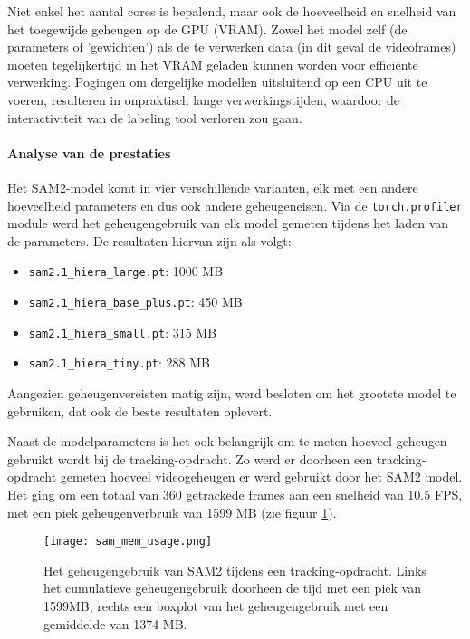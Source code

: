 Niet enkel het aantal cores is bepalend, maar ook de hoeveelheid en snelheid van het toegewijde geheugen op de GPU (VRAM).
Zowel het model zelf (de parameters of 'gewichten') als de te verwerken data (in dit geval de videoframes) moeten tegelijkertijd 
in het VRAM geladen kunnen worden voor efficiënte verwerking.
Pogingen om dergelijke modellen uitsluitend op een CPU uit te voeren, resulteren in onpraktisch lange verwerkingstijden, 
waardoor de interactiviteit van de labeling tool verloren zou gaan.


\paragraph{Analyse van de prestaties}

Het SAM2-model komt in vier verschillende varianten, elk met een andere hoeveelheid parameters en dus ook andere geheugeneisen.
Via de \texttt{torch.profiler} module werd het geheugengebruik van elk model gemeten tijdens het laden van de parameters.
De resultaten hiervan zijn als volgt:

\begin{itemize}
    \item \texttt{sam2.1\_hiera\_large.pt}: 1000 MB
    \item \texttt{sam2.1\_hiera\_base\_plus.pt}: 450 MB
    \item \texttt{sam2.1\_hiera\_small.pt}: 315 MB
    \item \texttt{sam2.1\_hiera\_tiny.pt}: 288 MB
\end{itemize}

Aangezien geheugenvereisten matig zijn, werd besloten om het grootste model te gebruiken, dat ook de beste resultaten oplevert.

Naast de modelparameters is het ook belangrijk om te meten hoeveel geheugen gebruikt wordt bij de tracking-opdracht.
Zo werd er doorheen een tracking-opdracht gemeten hoeveel videogeheugen er werd gebruikt door het SAM2 model.
Het ging om een totaal van 360 getrackede frames aan een snelheid van 10.5 FPS, met een piek geheugenverbruik van 1599 MB (zie figuur \ref{fig:sam-mem-usage}).

\begin{figure}[H]
  \centering
  \texttt{[image: sam\_mem\_usage.png]}
  \caption[]{\label{fig:sam-mem-usage} 
  Het geheugengebruik van SAM2 tijdens een tracking-opdracht. Links het cumulatieve geheugengebruik doorheen de tijd met een piek van 1599MB, rechts een boxplot van het geheugengebruik met een gemiddelde van 1374 MB. }
\end{figure}

